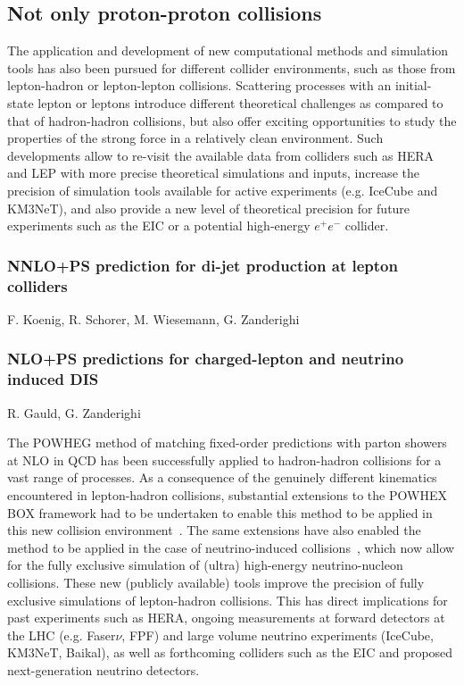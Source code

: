 \documentclass{FBR_Bericht_2025}
\begin{document}
\subsection{Not only proton-proton collisions}
\begin{refsection}
The application and development of new computational methods and simulation tools has also been pursued for different collider environments, such as those from lepton-hadron or lepton-lepton collisions.
%
Scattering processes with an initial-state lepton or leptons introduce different theoretical challenges as compared to that of hadron-hadron collisions, but also offer exciting opportunities to study the properties of the strong force in a relatively clean environment.
%
Such developments allow to re-visit the available data from colliders such as HERA and LEP with more precise theoretical simulations and inputs, increase the precision of simulation tools available for active experiments (e.g. IceCube and KM3NeT), and also provide a new level of theoretical precision for future experiments such as the EIC or a potential high-energy $e^+e^-$ collider. 
%
\subsubsection{NNLO+PS prediction for di-jet production at lepton colliders}
\begin{Namen}
F. Koenig, R. Schorer, M. Wiesemann, G. Zanderighi
\end{Namen}
%
\subsubsection{NLO+PS predictions for charged-lepton and neutrino induced DIS}
\begin{Namen}
R. Gauld, G. Zanderighi
\end{Namen}
The POWHEG method of matching fixed-order predictions with parton showers at NLO in QCD has been successfully applied to hadron-hadron collisions for a vast range of processes. As a consequence of the genuinely different kinematics encountered in lepton-hadron collisions, substantial extensions to the POWHEX BOX framework had to be undertaken to enable this method to be applied in this new collision environment~\cite{Banfi:2023mhz}.
The same extensions have also enabled the method to be applied in the case of neutrino-induced collisions~\cite{FerrarioRavasio:2024kem}, which now allow for the fully exclusive simulation of (ultra) high-energy neutrino-nucleon collisions.
These new (publicly available) tools improve the precision of fully exclusive simulations of lepton-hadron collisions. This has direct implications for past experiments such as HERA, ongoing measurements at forward detectors at the LHC (e.g. Faser$\nu$, FPF) and large volume neutrino experiments (IceCube, KM3NeT, Baikal), as well as forthcoming colliders such as the EIC and proposed next-generation neutrino detectors.
%

\end{refsection}
\end{document}
